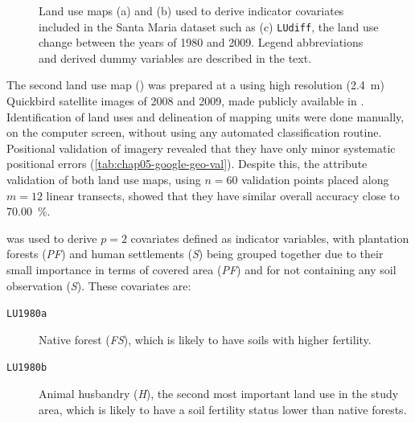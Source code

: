 \begin{figure}[!ht]
\begin{minipage}[b]{0.45\textwidth}
\end{minipage}
\caption[Land use maps included in the Santa Maria dataset.]{Land use maps (a) \landOld{} and (b) \landNew{} 
used to derive indicator covariates included in the Santa Maria dataset such as (c) \texttt{LUdiff}, the land 
use change between the years of 1980 and 2009. Legend abbreviations and derived dummy variables are described 
in the text.}
\label{fig:chap05-land-use}
\end{figure}

The second land use map (\landNew{}) was prepared at a  using high resolution (\SI{2.4}{\m}) 
Quickbird satellite images of \num{2008} and \num{2009}, made publicly available in \googleearth{} 
\cite{SamuelRosaEtAl2011a}. Identification of land uses and delineation of mapping units were done manually, on 
the computer screen, without using any automated classification routine. Positional validation of 
\googleearth{} imagery revealed that they have only minor systematic positional errors 
(\autoref{tab:chap05-google-geo-val}). Despite this, the attribute validation of both land use maps, using $n = 
60$ validation points placed along $m = 12$ linear transects, showed that they have similar overall accuracy 
close to \SI{70.00}{\percent}.


\landOld{} was used to derive $p = 2$ covariates defined as indicator variables, with plantation forests 
(\textit{PF}) and human settlements (\textit{S}) being grouped together due to their small importance in terms 
of 
covered area (\textit{PF}) and for not containing any soil observation (\textit{S}). These covariates are:

\begin{description}
 \item[\texttt{LU1980a}] Native forest (\textit{FS}), which is likely to have soils with higher fertility.
  
 \item[\texttt{LU1980b}] Animal husbandry (\textit{H}), the second most important land use in the study area, 
which is
 likely to have a soil fertility status lower than native forests.
\end{description}

